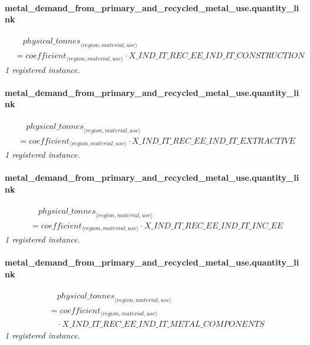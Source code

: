 \documentclass[11pt]{article}
\begin{document}
\paragraph{metal\_demand\_from\_primary\_and\_recycled\_metal\_use.quantity\_link}
\begin{align*}
&\quad {physical\_tonnes}_{\langle region, material, use\rangle}\\
&= coefficient_{\langle region, material, use\rangle} \cdot X\_IND\_IT\_REC\_EE\_IND\_IT\_CONSTRUCTION
\end{align*}
\noindent\emph{1 registered instance.}\par
\paragraph{metal\_demand\_from\_primary\_and\_recycled\_metal\_use.quantity\_link}
\begin{align*}
&\quad {physical\_tonnes}_{\langle region, material, use\rangle}\\
&= coefficient_{\langle region, material, use\rangle} \cdot X\_IND\_IT\_REC\_EE\_IND\_IT\_EXTRACTIVE
\end{align*}
\noindent\emph{1 registered instance.}\par
\paragraph{metal\_demand\_from\_primary\_and\_recycled\_metal\_use.quantity\_link}
\begin{align*}
&\quad {physical\_tonnes}_{\langle region, material, use\rangle}\\
&= coefficient_{\langle region, material, use\rangle} \cdot X\_IND\_IT\_REC\_EE\_IND\_IT\_INC\_EE
\end{align*}
\noindent\emph{1 registered instance.}\par
\paragraph{metal\_demand\_from\_primary\_and\_recycled\_metal\_use.quantity\_link}
\begin{align*}
&\quad {physical\_tonnes}_{\langle region, material, use\rangle}\\
&= coefficient_{\langle region, material, use\rangle}\\
&\quad {}\cdot X\_IND\_IT\_REC\_EE\_IND\_IT\_METAL\_COMPONENTS
\end{align*}
\noindent\emph{1 registered instance.}\par
\end{document}

